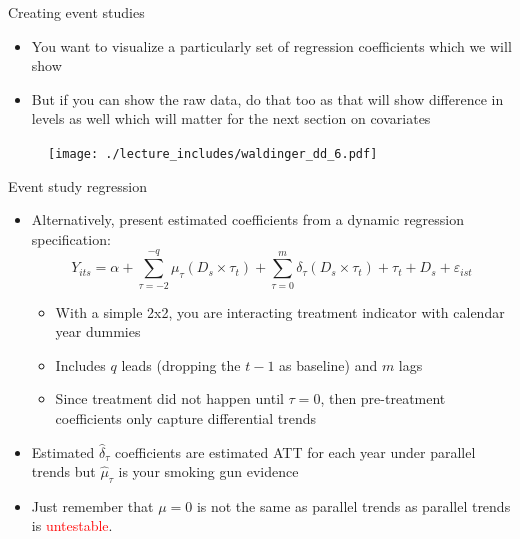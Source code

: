 \documentclass{beamer}
\begin{document}
\begin{frame}{Creating event studies}

\begin{itemize}

\item You want to visualize a particularly set of regression coefficients which we will show
\item But if you can show the raw data, do that too as that will show difference in levels as well which will matter for the next section on covariates

\end{itemize}

\end{frame}



\begin{frame}

	\begin{figure}
	\texttt{[image: ./lecture\_includes/waldinger\_dd\_6.pdf]}
	\end{figure}

\end{frame}


\begin{frame}{Event study regression}
	
	\begin{itemize}
	\item Alternatively, present estimated coefficients from a dynamic regression specification:
 $$Y_{its} = \alpha + \sum_{\tau=-2}^{-q}\mu_{\tau} (D_s \times \tau_t) + \sum_{\tau=0}^m\delta_{\tau} (D_s \times \tau_t) + \tau_t + D_s + \varepsilon_{ist}$$
		\begin{itemize}
		\item With a simple 2x2, you are interacting treatment indicator with calendar year dummies
		\item Includes $q$ leads (dropping the $t-1$ as baseline) and $m$ lags 
		\item Since treatment did not happen until $\tau=0$, then pre-treatment coefficients only capture differential trends
		\end{itemize}
	\item Estimated $\widehat{\delta}_\tau$ coefficients are estimated ATT for each year under parallel trends but $\widehat{\mu}_\tau$ is your smoking gun evidence 
	\item Just remember that $\mu=0$ is not the same as parallel trends as parallel trends is \textcolor{red}{untestable}.
	\end{itemize}
\end{frame}
\end{document}
